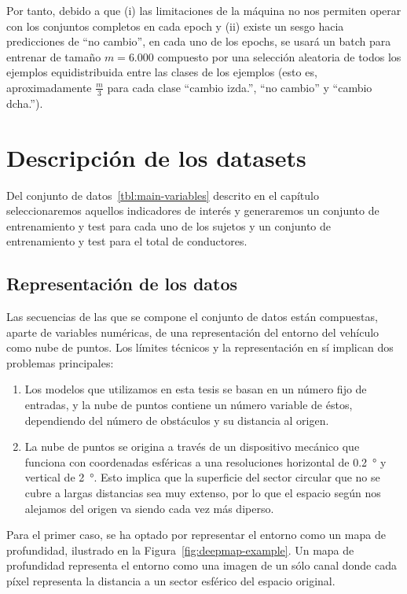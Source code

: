 Por tanto, debido a que (i) las limitaciones de la máquina no nos permiten operar con los conjuntos completos en cada epoch y (ii) existe un sesgo hacia predicciones de \enquote{no cambio}, en cada uno de los epochs, se usará un batch para entrenar de tamaño $m = 6.000$ compuesto por una selección aleatoria de todos los ejemplos equidistribuida entre las clases de los ejemplos (esto es, aproximadamente $\frac{m}{3}$ para cada clase \enquote{cambio izda.}, \enquote{no cambio} y \enquote{cambio dcha.}).

\section{Descripción de los datasets}

Del conjunto de datos~\ref{tbl:main-variables} descrito en el capítulo~ seleccionaremos aquellos indicadores de interés y generaremos un conjunto de entrenamiento y test para cada uno de los sujetos y un conjunto de entrenamiento y test para el total de conductores.

\subsection{Representación de los datos}

Las secuencias de las que se compone el conjunto de datos están compuestas, aparte de variables numéricas, de una representación del entorno del vehículo como nube de puntos. Los límites técnicos y la representación en sí implican dos problemas principales:

\begin{enumerate}
	\item Los modelos que utilizamos en esta tesis se basan en un número fijo de entradas, y la nube de puntos contiene un número variable de éstos, dependiendo del número de obstáculos y su distancia al origen.
	\item La nube de puntos se origina a través de un dispositivo mecánico que funciona con coordenadas esféricas a una resoluciones horizontal de \SI{0.2}{\degree} y vertical de \SI{2}{\degree}. Esto implica que la superficie del sector circular que no se cubre a largas distancias sea muy extenso, por lo que el espacio según nos alejamos del origen va siendo cada vez más diperso.
\end{enumerate}

Para el primer caso, se ha optado por representar el entorno como un mapa de profundidad, ilustrado en la Figura~\ref{fig:deepmap-example}. Un mapa de profundidad representa el entorno como una imagen de un sólo canal donde cada píxel representa la distancia a un sector esférico del espacio original.

